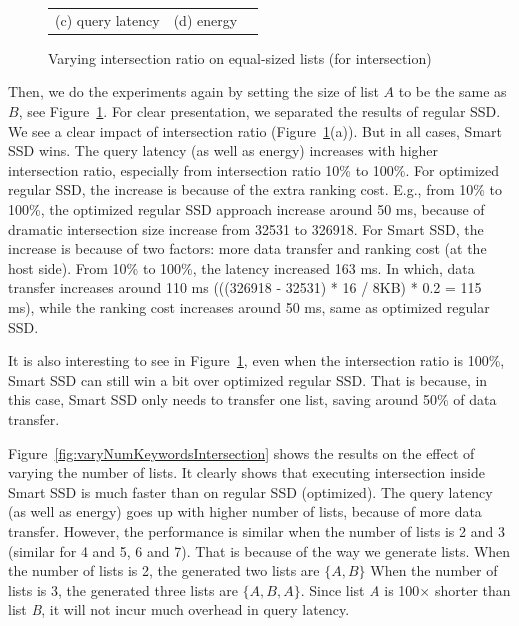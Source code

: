 \begin{figure}[tbp]
\begin{tabular}{ccc}
  (c) query latency & (d) energy
\end{tabular}
  \caption{Varying intersection ratio on equal-sized lists (for intersection)}
  \label{fig:varyInterRatioIntersection2}
 \end{figure}


Then, we do the experiments again by setting the size of list $A$ to be the same as $B$, %
see Figure~\ref{fig:varyInterRatioIntersection2}. For clear presentation, we separated the results of regular SSD. We see a clear impact of intersection ratio (Figure~\ref{fig:varyInterRatioIntersection2}(a)). But in all cases, Smart SSD wins.
The query latency (as well as energy)  increases with higher intersection ratio, especially from intersection ratio 10\% to 100\%. For optimized regular SSD, the increase is because of the extra ranking cost. E.g., from 10\% to 100\%, the optimized regular SSD approach increase around 50 ms, because of dramatic intersection size increase from 32531 to 326918. For Smart SSD, the increase is because of two factors: more data transfer and ranking cost (at the host side). From 10\% to 100\%, the latency increased 163 ms. In which, data transfer increases around 110 ms (((326918 - 32531) * 16 / 8KB) * 0.2 = 115 ms), while the ranking cost increases around 50 ms, same as optimized regular SSD.



It is also interesting to see in Figure~\ref{fig:varyInterRatioIntersection2}, even when the intersection ratio is 100\%, Smart SSD can still win a bit over optimized regular SSD. That is because, in this case, Smart SSD only needs to transfer one list, saving around 50\% of data transfer.




Figure~\ref{fig:varyNumKeywordsIntersection} shows the results on the effect of varying the number of lists.
It clearly shows that executing intersection inside Smart SSD is much faster than on regular SSD (optimized).
The query latency (as well as energy) goes up with higher number of lists, because of more data transfer.
However, the performance is similar when the number of lists is 2 and 3 (similar for 4 and 5, 6 and 7).
That is because of the way we generate lists.
When the number of lists is 2, the generated two lists are $\{A, B\}$
When the number of lists is 3, the generated three lists are $\{A, B, A\}$.
Since list \emph{A} is 100$\times$ shorter than list \emph{B}, it will not incur much overhead in query latency.

